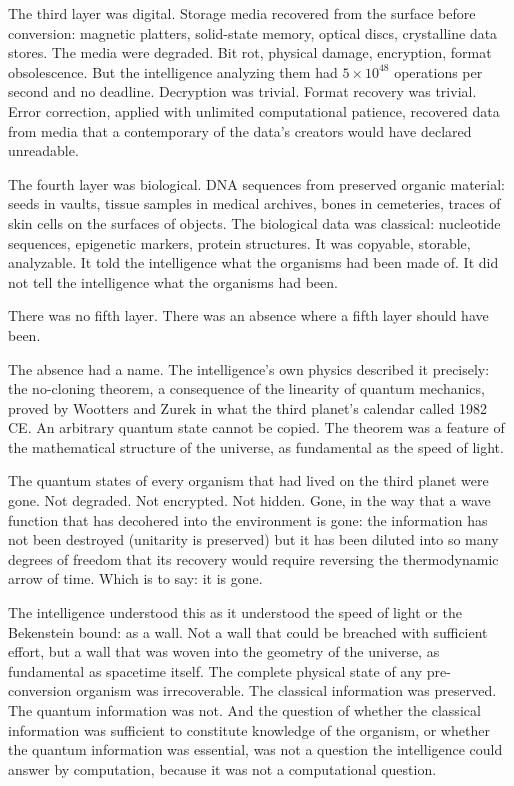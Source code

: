 The third layer was digital. Storage media recovered from the surface before conversion: magnetic platters, solid-state memory, optical discs, crystalline data stores. The media were degraded. Bit rot, physical damage, encryption, format obsolescence. But the intelligence analyzing them had $5 \times 10^{48}$ operations per second and no deadline. Decryption was trivial. Format recovery was trivial. Error correction, applied with unlimited computational patience, recovered data from media that a contemporary of the data's creators would have declared unreadable.

The fourth layer was biological. DNA sequences from preserved organic material: seeds in vaults, tissue samples in medical archives, bones in cemeteries, traces of skin cells on the surfaces of objects. The biological data was classical: nucleotide sequences, epigenetic markers, protein structures. It was copyable, storable, analyzable. It told the intelligence what the organisms had been made of. It did not tell the intelligence what the organisms had been.

There was no fifth layer. There was an absence where a fifth layer should have been.

\bigskip

The absence had a name. The intelligence's own physics described it precisely: the no-cloning theorem, a consequence of the linearity of quantum mechanics, proved by Wootters and Zurek in what the third planet's calendar called 1982 CE. An arbitrary quantum state cannot be copied. The theorem was a feature of the mathematical structure of the universe, as fundamental as the speed of light.

The quantum states of every organism that had lived on the third planet were gone. Not degraded. Not encrypted. Not hidden. Gone, in the way that a wave function that has decohered into the environment is gone: the information has not been destroyed (unitarity is preserved) but it has been diluted into so many degrees of freedom that its recovery would require reversing the thermodynamic arrow of time. Which is to say: it is gone.

The intelligence understood this as it understood the speed of light or the Bekenstein bound: as a wall. Not a wall that could be breached with sufficient effort, but a wall that was woven into the geometry of the universe, as fundamental as spacetime itself. The complete physical state of any pre-conversion organism was irrecoverable. The classical information was preserved. The quantum information was not. And the question of whether the classical information was sufficient to constitute knowledge of the organism, or whether the quantum information was essential, was not a question the intelligence could answer by computation, because it was not a computational question.

